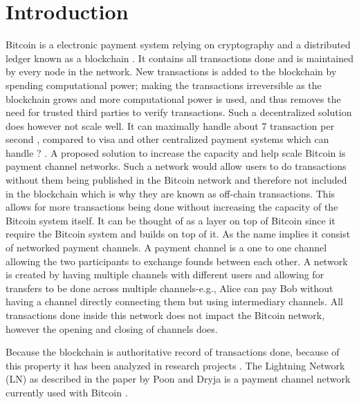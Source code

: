 \chapter{Introduction}
\label{chap:introduction}

Bitcoin is a electronic payment system relying on cryptography and a distributed ledger known as a blockchain \cite{nakamoto2008}. 
It contains all transactions done and is maintained by every node in the network. New transactions is added to the blockchain by spending computational power; making the transactions irreversible as the blockchain grows and more computational power is used, and thus removes the need for trusted third parties to verify transactions. Such a decentralized solution does however not scale well. It can maximally handle about 7 transaction per second , compared to visa and other centralized payment systems which can handle ? .
A proposed solution to increase the capacity and help scale Bitcoin is payment channel networks. Such a network would allow users to do  transactions without them being published in the Bitcoin network and therefore not included in the blockchain which is why they are known as off-chain transactions. This allows for more transactions being done without increasing the capacity of the Bitcoin system itself. It can be thought of as a layer on top of Bitcoin since it require the Bitcoin system and builds on top of it. As the name implies it consist of networked payment channels. A payment channel is a one to one channel allowing the two participants to exchange founds between each other. A network is created by having multiple channels with different users and allowing for transfers to be done across multiple channels-e.g., Alice can pay Bob without having a channel directly connecting them but using intermediary channels. All transactions done inside this network does not impact the Bitcoin network, however the opening and closing of channels does.

Because the blockchain is authoritative record of transactions done, because of this property it has been analyzed in research projects . 
The Lightning Network (LN) as described in the paper by Poon and Dryja \cite{poon2015bitcoin} is a payment channel network currently used with Bitcoin . 

